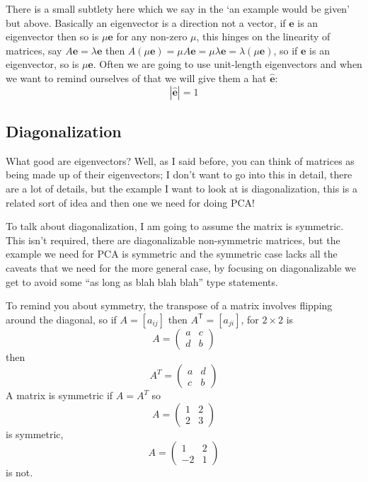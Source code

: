 \documentclass[12pt]{article}
\begin{document}
There is a small subtlety here which we say in the `an example would
be given' but above. Basically an eigenvector is a direction not a
vector, if $\mathbf{e}$ is an eigenvector then so is $\mu\mathbf{e}$
for any non-zero $\mu$, this hinges on the linearity of matrices, say
$A\mathbf{e}=\lambda\mathbf{e}$ then $A(\mu\mathbf{e})=\mu
A\mathbf{e}=\mu\lambda\mathbf{e}=\lambda(\mu\mathbf{e})$, so if
$\mathbf{e}$ is an eigenvector, so is $\mu\mathbf{e}$. Often we are
going to use unit-length eigenvectors and when we want to remind
ourselves of that we will give them a hat $\hat{\mathbf{e}}$:
\begin{equation}
  |\hat{\mathbf{e}}|=1
\end{equation}

\subsection*{Diagonalization}

What good are eigenvectors? Well, as I said before, you can think of
matrices as being made up of their eigenvectors; I don't want to go
into this in detail, there are a lot of details, but the example I
want to look at is diagonalization, this is a related sort of idea and
then one we need for doing PCA!

To talk about diagonalization, I am going to assume the matrix is
symmetric. This isn't required, there are diagonalizable non-symmetric
matrices, but the example we need for PCA is symmetric and the
symmetric case lacks all the caveats that we need for the more general
case, by focusing on diagonalizable we get to avoid some ``as long as
blah blah blah'' type statements.

To remind you about symmetry, the transpose of a matrix involves
flipping around the diagonal, so if $A=[a_{ij}]$ then $A^{\mathsf T}=[a_{ji}]$,
for $2\times 2$ is
\begin{equation}
  A=
\begin{pmatrix}
a & c \\
d & b
  \end{pmatrix}
\end{equation}
then
\begin{equation}
  A^T=
\begin{pmatrix}
a & d \\
c & b
  \end{pmatrix}
\end{equation}
A matrix is symmetric if $A=A^T$ so
\begin{equation}
  A=
\begin{pmatrix}
1 & 2 \\
2 & 3
  \end{pmatrix}
\end{equation}
is symmetric,
\begin{equation}
  A=
\begin{pmatrix}
1 & 2 \\
-2 & 1
  \end{pmatrix}
\end{equation}
is not.
\end{document}
